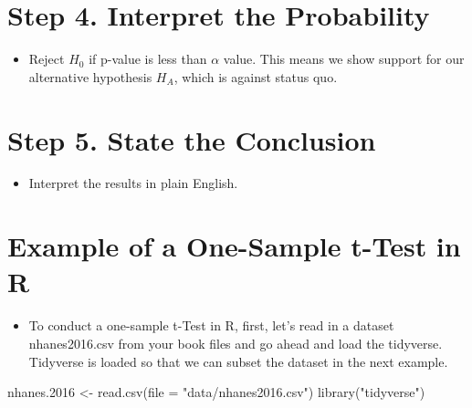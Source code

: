 \documentclass[
  letterpaper,
  DIV=11,
  numbers=noendperiod]{scrreprt}
\newenvironment{Shaded}{\begin{snugshade}}{\end{snugshade}}
\newcommand{\AttributeTok}[1]{\textcolor[rgb]{0.40,0.45,0.13}{#1}}
\newcommand{\FloatTok}[1]{\textcolor[rgb]{0.68,0.00,0.00}{#1}}
\newcommand{\FunctionTok}[1]{\textcolor[rgb]{0.28,0.35,0.67}{#1}}
\newcommand{\NormalTok}[1]{\textcolor[rgb]{0.00,0.23,0.31}{#1}}
\newcommand{\OtherTok}[1]{\textcolor[rgb]{0.00,0.23,0.31}{#1}}
\newcommand{\StringTok}[1]{\textcolor[rgb]{0.13,0.47,0.30}{#1}}
\providecommand{\tightlist}{%
  \setlength{\itemsep}{0pt}\setlength{\parskip}{0pt}}\usepackage{longtable,booktabs,array}
\begin{document}
\section{Step 4. Interpret the
Probability}\label{step-4.-interpret-the-probability}

\begin{itemize}
\tightlist
\item
  Reject \(H_0\) if p-value is less than \(\alpha\) value. This means we
  show support for our alternative hypothesis \(H_A\), which is against
  status quo.
\end{itemize}

\section{Step 5. State the
Conclusion}\label{step-5.-state-the-conclusion}

\begin{itemize}
\tightlist
\item
  Interpret the results in plain English.
\end{itemize}

\section{Example of a One-Sample t-Test in
R}\label{example-of-a-one-sample-t-test-in-r}

\begin{itemize}
\tightlist
\item
  To conduct a one-sample t-Test in R, first, let's read in a dataset
  nhanes2016.csv from your book files and go ahead and load the
  tidyverse. Tidyverse is loaded so that we can subset the dataset in
  the next example.
\end{itemize}

\begin{Shaded}
\begin{Highlighting}[]
\NormalTok{nhanes}\FloatTok{.2016} \OtherTok{\textless{}{-}} \FunctionTok{read.csv}\NormalTok{(}\AttributeTok{file =} \StringTok{"data/nhanes2016.csv"}\NormalTok{)}
\FunctionTok{library}\NormalTok{(}\StringTok{"tidyverse"}\NormalTok{)}
\end{Highlighting}
\end{Shaded}
\end{document}
